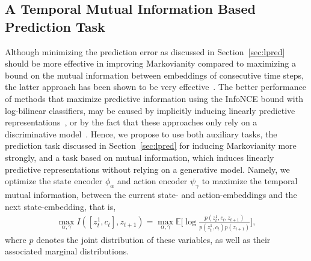 \documentclass[a4paper,12pt]{article}
\begin{document}
\subsection{A Temporal Mutual Information Based Prediction Task}
\label{sec:ltmi}
Although minimizing the prediction error as discussed in Section~\ref{sec:lpred} should be more effective in improving Markovianity compared to maximizing a bound on the mutual information between embeddings of consecutive time steps, the latter approach has been shown to be very effective~\cite{lee2020predictive, anand2019unsupervised}. The better performance of methods that maximize predictive information using the InfoNCE bound with log-bilinear classifiers, may be caused by implicitly inducing linearly predictive representations~\cite{anand2019unsupervised}, or by the fact that these approaches only rely on a discriminative model~\cite{kim2018emi}. Hence, we propose to use both auxiliary tasks, the prediction task discussed in Section~\ref{sec:lpred} for inducing Markovianity more strongly, and a task based on mutual information, which induces linearly predictive representations without relying on a generative model.
Namely, we optimize the state encoder $\phi_\alpha$ and action encoder $\psi_\gamma$ to maximize the temporal mutual information, between the current state- and action-embeddings and the next state-embedding, that is,
\begin{equation}
\begin{split}
    \max_{\alpha, \gamma}I([z_t^1, c_t], z_{t+1}) = \max_{\alpha, \gamma} \mathbb{E}\bigg[\log\frac{p(z_t^1, c_t, z_{t+1})}{p(z_t^1,c_t)p(z_{t+1})} \bigg],
\end{split}
\end{equation}
where $p$ denotes the joint distribution of these variables, as well as their associated marginal distributions.
\end{document}
